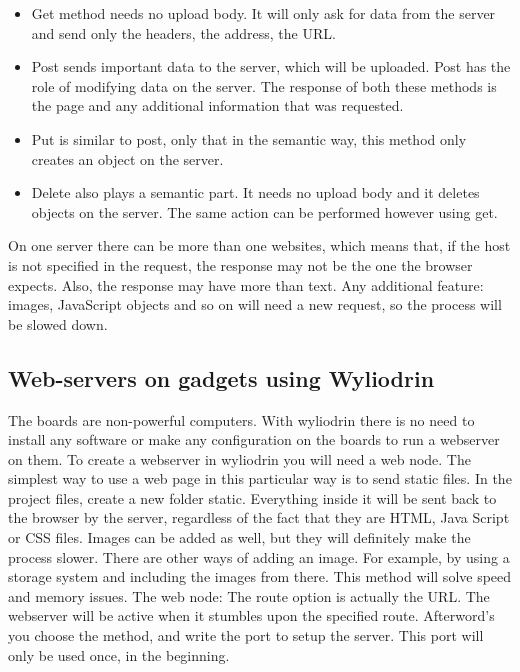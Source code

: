 \begin{itemize}
\item Get method needs no upload body. It will only ask for data from the server and send only the headers, the address, the URL. 
\item Post sends important data to the server, which will be uploaded. Post has the role of modifying data on the server. The response of both these methods is the page and any additional information that was requested.  
\item Put is similar to post, only that in the semantic way, this method only creates an object on the server. 
\item Delete also plays a semantic part. It needs no upload body and it deletes objects on the server. The same action can be performed however using get. 
  
\end{itemize}

On one server there can be more than one websites, which means that, if the host is not specified in the request, the response may not be the one the browser expects.  
Also, the response may have more than text. Any additional feature: images, JavaScript objects and so on will need a new request, so the process will be slowed down.  

\subsection{Web-servers on gadgets using Wyliodrin}
The boards are non-powerful computers. With wyliodrin there is no need to install any software or make any configuration on the boards to run a webserver on them. 
To create a webserver in wyliodrin you will need a web node. The simplest way to use a web page in this particular way is to send static files. In the project files, create a new folder static. Everything inside it will be sent back to the browser by the server, regardless of the fact that they are HTML, Java Script or CSS files. Images can be added as well, but they will definitely make the process slower. There are other ways of adding an image. For example, by using a storage system and including the images from there. This method will solve speed and memory issues.  
The web node: The route option is actually the URL. The webserver will be active when it stumbles upon the specified route. Afterword’s you choose the method, and write the port to setup the server. This port will only be used once, in the beginning.  

